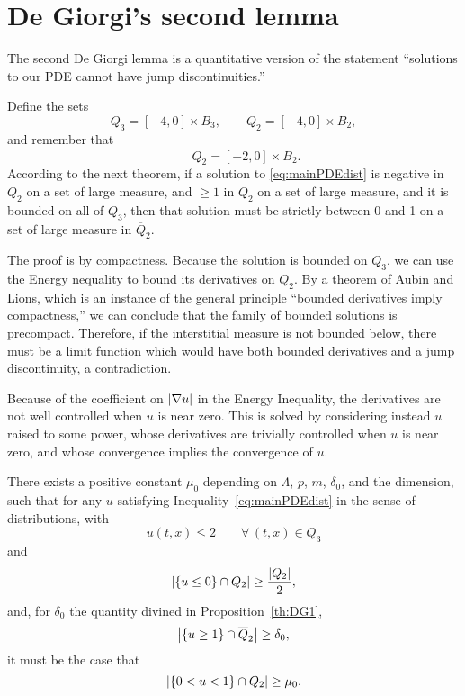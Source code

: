 \section{De Giorgi's second lemma} \label{sec:DG2}


The second De Giorgi lemma is a quantitative version of the statement ``solutions to our PDE cannot have jump discontinuities.''  

Define the sets
\[ Q_3 = [-4,0]\times B_3, \qquad Q_2 = [-4,0]\times B_2, \]
and remember that 
\[ \qquad \overline{Q}_2 = [-2,0]\times B_2.\]  
According to the next theorem, if a solution to \eqref{eq:mainPDEdist} is negative in $Q_2$ on a set of large measure, and $\geq 1$ in $\overline{Q}_2$ on a set of large measure, and it is bounded on all of $Q_3$, then that solution must be strictly between 0 and 1 on a set of large measure in $\overline{Q}_2$.  

The proof is by compactness.  Because the solution is bounded on $Q_3$, we can use the Energy nequality to bound its derivatives on $Q_2$.  By a theorem of Aubin and Lions, which is an instance of the general principle ``bounded derivatives imply compactness,'' we can conclude that the family of bounded solutions is precompact.  Therefore, if the interstitial measure is not bounded below, there must be a limit function which would have both bounded derivatives and a jump discontinuity, a contradiction.  

Because of the coefficient on $|\nabla u|$ in the Energy Inequality, the derivatives are not well controlled when $u$ is near zero.  This is solved by considering instead $u$ raised to some power, whose derivatives are trivially controlled when $u$ is near zero, and whose convergence implies the convergence of $u$.  

\begin{proposition}\label{th:DG2}
There exists a positive constant $\mu_0$ depending on $\Lambda$, $p$, $m$, $\delta_0$, and the dimension, such that for any $u$
satisfying Inequality~\eqref{eq:mainPDEdist} in the sense of distributions, with 
\[ u(t,x) \leq 2 \qquad \forall\,(t,x) \in Q_3\]
and
\[\left\lvert \{u \leq 0\} \cap Q_2 \right\rvert \geq \frac{\left\lvert Q_2 \right\rvert}{2},\] 
and, for $\delta_0$ the quantity divined in Proposition~\ref{th:DG1},
\[ \left\lvert \{u \geq 1\} \cap \overline{Q}_2 \right\rvert \geq \delta_0,\]  
it must be the case that
\[ \left\lvert \{0 < u < 1\} \cap Q_2 \right\rvert \geq \mu_0.\]  
\end{proposition}

